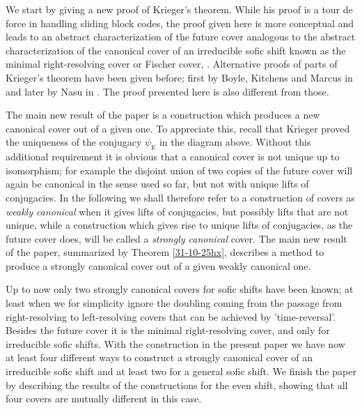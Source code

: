 \documentclass[12pt,oneside,english]{amsart}
\begin{document}
We start by giving a new proof of Krieger's theorem. While his proof is a tour de force in handling sliding block codes, the proof given here is more conceptual and leads to an abstract characterization of the future cover analogous to the abstract characterization of the canonical cover of an irreducible sofic shift known as the minimal right-resolving cover or Fischer cover, \cite{F}. Alternative proofs of parts of Krieger's theorem have been given before; first by Boyle, Kitchens and Marcus in \cite{BKM} and later by Nasu in \cite{N}. The proof presented here is also different from those. %

The main new result of the paper is a construction which produces a new canonical cover out of a given one. To appreciate this, recall that Krieger proved the uniqueness of the conjugacy $\psi_\mathbb K$ in the diagram above. Without this additional requirement it is obvious that a canonical cover is not unique up to isomorphism; for example the disjoint union of two copies of the future cover will again be canonical in the sense used so far, but not with unique lifts of conjugacies. In the following we shall therefore refer to a construction of covers as \emph{weakly canonical} when it gives lifts of conjugacies, but possibly lifts that are not unique, while a construction which gives rise to unique lifts of conjugacies, as the future cover does, will be called a \emph{strongly canonical} cover.   The main new result of the paper, summarized by Theorem \ref{31-10-25hx}, describes a method to produce a strongly canonical cover out of a given weakly canonical one. 

  Up to now only two strongly canonical covers for sofic shifts have been known; at least when we for simplicity ignore the doubling coming from the passage from right-resolving to left-resolving covers that can be achieved by 'time-reversal'. Besides the future cover it is the minimal right-resolving cover, and only for irreducible sofic shifts. With the construction in the present paper we have now at least four different ways to construct a strongly canonical cover of an irreducible sofic shift and at least two for a general sofic shift. We finish the paper by describing the results of the constructions for the even shift, showing that all four covers are mutually different in this case.
  
\end{document}
